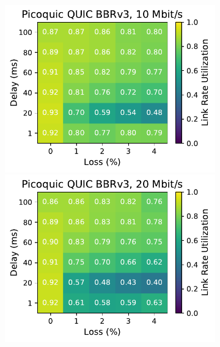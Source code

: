 \begin{figure}[ht]
\begin{subfigure}[b]{0.22\linewidth}
        \includegraphics[width=\linewidth,trim={0 0 2cm 0},clip]{splitting-paper/figures/heatmaps/heatmap_picoquic_bbr3_10mbps.pdf}
        \includegraphics[width=\linewidth,trim={0 0 2cm 0},clip]{splitting-paper/figures/heatmaps/heatmap_picoquic_bbr3_20mbps.pdf}

\end{subfigure}
\end{figure}

